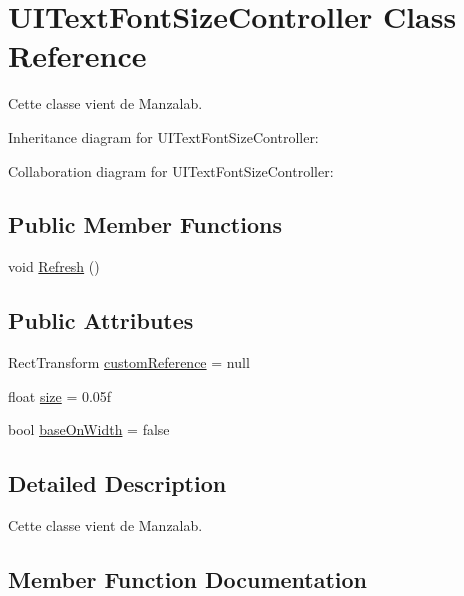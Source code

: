 \hypertarget{class_u_i_text_font_size_controller}{}\section{U\+I\+Text\+Font\+Size\+Controller Class Reference}
\label{class_u_i_text_font_size_controller}


Cette classe vient de Manzalab.  




Inheritance diagram for U\+I\+Text\+Font\+Size\+Controller\+:


Collaboration diagram for U\+I\+Text\+Font\+Size\+Controller\+:
\subsection*{Public Member Functions}
\begin{DoxyCompactItemize}
\item 
void \hyperlink{class_u_i_text_font_size_controller_acfcd715f293323aecf5c5a72067f4c0b}{Refresh} ()
\end{DoxyCompactItemize}
\subsection*{Public Attributes}
\begin{DoxyCompactItemize}
\item 
Rect\+Transform \hyperlink{class_u_i_text_font_size_controller_a9bc9451c414a96676b561f62cffd1750}{custom\+Reference} = null
\item 
float \hyperlink{class_u_i_text_font_size_controller_abfc9c83c14afcf5912ef8052aeb1b612}{size} = 0.\+05f
\item 
bool \hyperlink{class_u_i_text_font_size_controller_a844ddc09261ec6a7ee612efbb73cc1f8}{base\+On\+Width} = false
\end{DoxyCompactItemize}


\subsection{Detailed Description}
Cette classe vient de Manzalab. 



\subsection{Member Function Documentation}
\mbox{\label{class_u_i_text_font_size_controller_acfcd715f293323aecf5c5a72067f4c0b}} 
